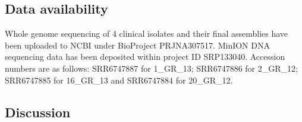 \subsection{Data availability}
Whole genome sequencing of 4 clinical isolates and their final assemblies have been uploaded to NCBI under BioProject PRJNA307517.
MinION DNA sequencing data has been deposited within project ID SRP133040. 
Accession numbers are as follows: SRR6747887 for 1\_GR\_13; SRR6747886 for 2\_GR\_12; SRR6747885 for 16\_GR\_13 and SRR6747884 for 20\_GR\_12.
\subsection{Discussion}
